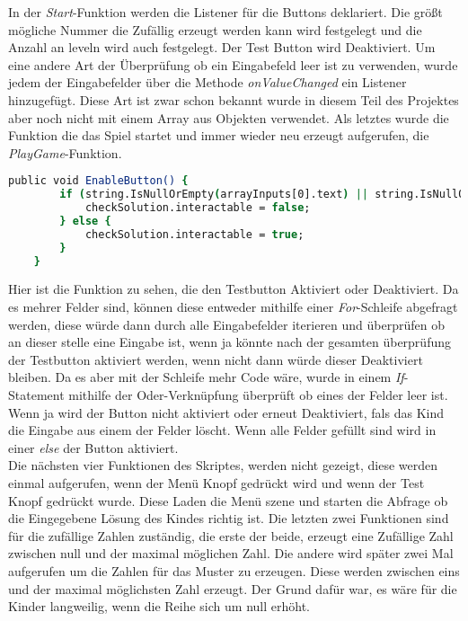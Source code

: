 In der \textit{Start}-Funktion werden die Listener für die Buttons deklariert. Die größt mögliche Nummer die Zufällig erzeugt werden kann wird festgelegt und die Anzahl an leveln wird auch festgelegt. Der Test Button wird Deaktiviert. Um eine andere Art der Überprüfung ob ein Eingabefeld leer ist zu verwenden, wurde jedem der Eingabefelder über die Methode \textit{onValueChanged} ein Listener hinzugefügt. Diese Art ist zwar schon bekannt wurde in diesem Teil des Projektes aber noch nicht mit einem Array aus Objekten verwendet. Als letztes wurde die Funktion die das Spiel startet und immer wieder neu erzeugt aufgerufen, die \textit{PlayGame}-Funktion.\\
\begin{lstlisting}[language=csh, caption={hideCircle.cs EnableButton-Funktion}]
	public void EnableButton() {
		if (string.IsNullOrEmpty(arrayInputs[0].text) || string.IsNullOrEmpty(arrayInputs[1].text) || string.IsNullOrEmpty(arrayInputs[2].text) || string.IsNullOrEmpty(arrayInputs[3].text) || string.IsNullOrEmpty(arrayInputs[4].text)) {
			checkSolution.interactable = false;
		} else {
			checkSolution.interactable = true;
		}
	}
\end{lstlisting}
Hier ist die Funktion zu sehen, die den Testbutton Aktiviert oder Deaktiviert. Da es mehrer Felder sind, können diese entweder mithilfe einer \textit{For}-Schleife abgefragt werden, diese würde dann durch alle Eingabefelder iterieren und überprüfen ob an dieser stelle eine Eingabe ist, wenn ja könnte nach der gesamten überprüfung der Testbutton aktiviert werden, wenn nicht dann würde dieser Deaktiviert bleiben. Da es aber mit der Schleife mehr Code wäre, wurde in einem \textit{If}-Statement mithilfe der Oder-Verknüpfung überprüft ob eines der Felder leer ist. Wenn ja wird der Button nicht aktiviert oder erneut Deaktiviert, fals das Kind die Eingabe aus einem der Felder löscht. Wenn alle Felder gefüllt sind wird in einer \textit{else} der Button aktiviert.\\
Die nächsten vier Funktionen des Skriptes, werden nicht gezeigt, diese werden einmal aufgerufen, wenn der Menü Knopf gedrückt wird und wenn der Test Knopf gedrückt wurde. Diese Laden die Menü szene und starten die Abfrage ob die Eingegebene Lösung des Kindes richtig ist. Die letzten zwei Funktionen sind für die zufällige Zahlen zuständig, die erste der beide, erzeugt eine Zufällige Zahl zwischen null und der maximal möglichen Zahl. Die andere wird später zwei Mal aufgerufen um die Zahlen für das Muster zu erzeugen. Diese werden zwischen eins und der maximal möglichsten Zahl erzeugt. Der Grund dafür war, es wäre für die Kinder langweilig, wenn die Reihe sich um null erhöht. \\

